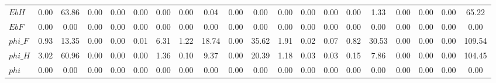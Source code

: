 \begin{center}
\begin{longtable}{lccccccccccccccccccc}
$EbH                        $	 & 	                0.00	 & 	               63.86	 & 	                0.00	 & 	                0.00	 & 	                0.00	 & 	                0.00	 & 	                0.00	 & 	                0.04	 & 	                0.00	 & 	                0.00	 & 	                0.00	 & 	                0.00	 & 	                0.00	 & 	                0.00	 & 	                1.33	 & 	                0.00	 & 	                0.00	 & 	                0.00	 & 	               65.22 \\ 
$EbF                        $	 & 	                0.00	 & 	                0.00	 & 	                0.00	 & 	                0.00	 & 	                0.00	 & 	                0.00	 & 	                0.00	 & 	                0.00	 & 	                0.00	 & 	                0.00	 & 	                0.00	 & 	                0.00	 & 	                0.00	 & 	                0.00	 & 	                0.00	 & 	                0.00	 & 	                0.00	 & 	                0.00	 & 	                0.00 \\ 
$phi\_F                     $	 & 	                0.93	 & 	               13.35	 & 	                0.00	 & 	                0.00	 & 	                0.01	 & 	                6.31	 & 	                1.22	 & 	               18.74	 & 	                0.00	 & 	               35.62	 & 	                1.91	 & 	                0.02	 & 	                0.07	 & 	                0.82	 & 	               30.53	 & 	                0.00	 & 	                0.00	 & 	                0.00	 & 	              109.54 \\ 
$phi\_H                     $	 & 	                3.02	 & 	               60.96	 & 	                0.00	 & 	                0.00	 & 	                0.00	 & 	                1.36	 & 	                0.10	 & 	                9.37	 & 	                0.00	 & 	               20.39	 & 	                1.18	 & 	                0.03	 & 	                0.03	 & 	                0.15	 & 	                7.86	 & 	                0.00	 & 	                0.00	 & 	                0.00	 & 	              104.45 \\ 
$phi                        $	 & 	                0.00	 & 	                0.00	 & 	                0.00	 & 	                0.00	 & 	                0.00	 & 	                0.00	 & 	                0.00	 & 	                0.00	 & 	                0.00	 & 	                0.00	 & 	                0.00	 & 	                0.00	 & 	                0.00	 & 	                0.00	 & 	                0.00	 & 	                0.00	 & 	                0.00	 & 	                0.00	 & 	                0.00 \\ 

\end{longtable}
\end{center}
